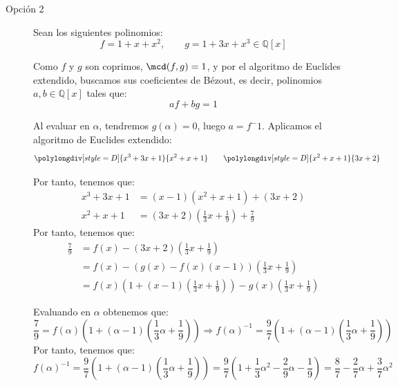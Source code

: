 \begin{ejercicio}
\begin{description}
        \item[Opción 2] Sean los siguientes polinomios:
        \begin{equation*}
            f = 1+x+x^2, \qquad g = 1+3x+ x^3\in \mathbb{Q}[x]
        \end{equation*}

        Como $f$ y $g$ son coprimos, $\mcd(f,g) = 1$, y por el algoritmo de Euclides extendido, buscamos sus coeficientes de Bézout, es decir, polinomios $a,b\in \mathbb{Q}[x]$ tales que:
        \begin{equation*}
            af + bg = 1
        \end{equation*}

        Al evaluar en $\alpha$, tendremos $g(\alpha)=0$, luego $a=f^-1$. Aplicamos el algoritmo de Euclides extendido:
        \begin{equation*}
            \polylongdiv[style=D]{x^3+3x+1}{x^2+x+1}\qquad 
            \polylongdiv[style=D]{x^2+x+1}{3x+2}
        \end{equation*}

        Por tanto, tenemos que:
        \begin{align*}
            x^3+3x+1 &= (x-1)(x^2+x+1) + (3x+2) \\
            x^2+x+1 &= (3x+2)\left(\frac{1}{3}x+\frac{1}{9}\right) + \frac{7}{9}
        \end{align*}
        Por tanto, tenemos que:
        \begin{align*}
            \frac{7}{9} &= f(x) - (3x+2)\left(\frac{1}{3}x+\frac{1}{9}\right) \\
                        &= f(x) - \left(g(x) - f(x)(x-1)\right)\left(\frac{1}{3}x+\frac{1}{9}\right) \\
                        &= f(x)\left(1+(x-1)\left(\frac{1}{3}x+\frac{1}{9}\right)\right) - g(x)\left(\frac{1}{3}x+\frac{1}{9}\right)
        \end{align*}

        Evaluando en $\alpha$ obtenemos que:
        \begin{equation*}
            \frac{7}{9} = f(\alpha)\left(1+(\alpha-1)\left(\frac{1}{3}\alpha+\frac{1}{9}\right)\right) \Longrightarrow f(\alpha)^{-1} = \frac{9}{7}\left(1+(\alpha-1)\left(\frac{1}{3}\alpha+\frac{1}{9}\right)\right)
        \end{equation*}
        Por tanto, tenemos que:
        \begin{equation*}
            f(\alpha)^{-1} = \frac{9}{7}\left(1+(\alpha-1)\left(\frac{1}{3}\alpha+\frac{1}{9}\right)\right) = \frac{9}{7}\left(1+\frac{1}{3}\alpha^2 - \frac{2}{9}\alpha - \frac{1}{9}\right) = \frac{8}{7} - \frac{2}{7}\alpha + \frac{3}{7}\alpha^2
        \end{equation*}
    \end{description}


\end{ejercicio}
